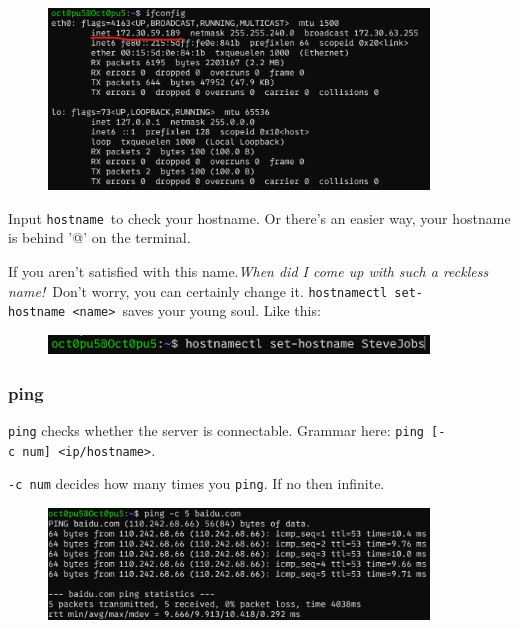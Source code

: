\documentclass[12pt]{ctexart}
\begin{document}
\begin{figure}[H]
    \centering
    \includegraphics[width=0.9\textwidth,keepaspectratio]{assets/Linux/1.9 Linux network commands/1.png}
\end{figure}

Input \texttt{hostname}\ to check your hostname. Or
there's an easier way, your hostname is behind '@' on
the terminal.

If you aren't satisfied with this name.\emph{When did I
come up with such a reckless name!}\ Don't worry, you can
certainly change it.
\texttt{hostnamectl\ set-hostname\ \textless{}name\textgreater{}}\ saves
your young soul. Like this:

\begin{figure}[H]
    \centering
    \includegraphics[width=0.9\textwidth,keepaspectratio]{assets/Linux/1.9 Linux network commands/2.png}
\end{figure}

\subsubsection{\textbf{ping}}

\texttt{ping} checks whether the server is connectable. Grammar here:
\texttt{ping\ {[}-c\ num{]}\ \textless{}ip/hostname\textgreater{}}.

\texttt{-c\ num} decides how many times you \texttt{ping}. If no then
infinite.

\begin{figure}[H]
    \centering
    \includegraphics[width=0.9\textwidth,keepaspectratio]{assets/Linux/1.9 Linux network commands/3.png}
\end{figure}
\end{document}
